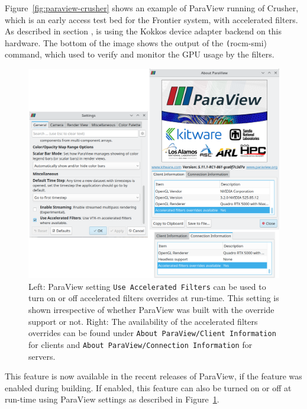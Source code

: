 Figure~\ref{fig:paraview-crusher} shows an example of ParaView running of Crusher, which is an early access test bed for the Frontier system, with \vtkm accelerated filters. As described in section , \vtkm is using the Kokkos device adapter backend on this hardware. The bottom of the image shows the output of the \texttt(rocm-smi) command, which used to verify and monitor the GPU usage by the filters.

\begin{figure}[htb]
  \includegraphics[width=\linewidth]{figures/pv-override-settings.png}
  \caption{Left: ParaView setting \texttt{Use Accelerated Filters} can be used to turn on or off accelerated filters overrides at run-time. This setting is shown irrespective of whether ParaView was built with the override support or not. Right: The availability of the accelerated filters overrides can be found under \texttt{About ParaView/Client Information} for clients and \texttt{About ParaView/Connection Information} for servers.}
  \label{fig:paraview_settings}
\end{figure}

This feature is now available in the recent releases of ParaView, if the feature was enabled during building. If enabled, this feature can also be turned on or off at run-time using ParaView settings as described in Figure~\ref{fig:paraview_settings}.

